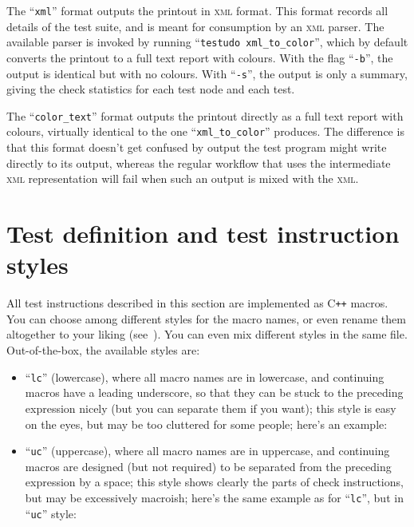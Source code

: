 \documentclass[twoside, a4paper, article]{memoir}
\newcommand*\Cpp{C\texttt{++}}
\begin{document}
The ``\texttt{xml}'' format outputs the printout in \textsc{xml} format.  This
format records all details of the test suite, and is meant for consumption by
an \textsc{xml} parser.  The available parser is invoked by running
``\texttt{testudo xml\_to\_color}'', which by default converts the printout to
a full text report with colours.  With the flag ``\texttt{-b}'', the output is
identical but with no colours.  With ``\texttt{-s}'', the output is only a
summary, giving the check statistics for each test node and each test.

The ``\texttt{color\_text}'' format outputs the printout directly as a full
text report with colours, virtually identical to the one
``\texttt{xml\_to\_color}'' produces.  The difference is that this format
doesn't get confused by output the test program might write directly to its
output, whereas the regular workflow that uses the intermediate \textsc{xml}
representation will fail when such an output is mixed with the \textsc{xml}.


\chapter{Test definition and test instruction styles}
\label{cha:test-definition-test-instruction-styles}

All test instructions described in this section are implemented as \Cpp{}
macros.  You can choose among different styles for the macro names, or even
rename them altogether to your liking
(see~).  You can even mix different
styles in the same file.  Out-of-the-box, the available styles are:
\begin{itemize}
\item ``\texttt{lc}'' (lowercase), where all macro names are in lowercase, and
  continuing macros have a leading underscore, so that they can be stuck to the
  preceding expression nicely (but you can separate them if you want); this
  style is easy on the eyes, but may be too cluttered for some people; here's
  an example:
  

\item ``\texttt{uc}'' (uppercase), where all macro names are in uppercase, and
  continuing macros are designed (but not required) to be separated from the
  preceding expression by a space; this style shows clearly the parts of check
  instructions, but may be excessively macroish; here's the same example as for
  ``\texttt{lc}'', but in ``\texttt{uc}'' style:
  
\end{itemize}
\end{document}

